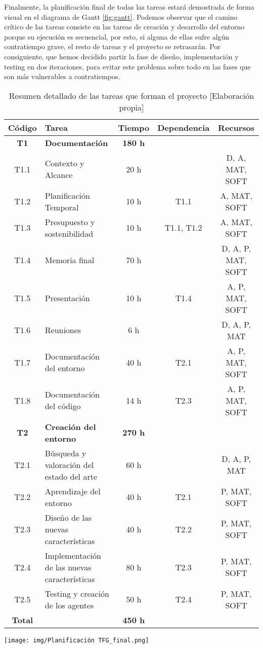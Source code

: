 Finalmente, la planificación final de todas las tareas estará demostrada de forma visual en el diagrama de Gantt \ref{fig:gantt}. Podemos observar que el camino crítico de las tareas consiste en las tareas de creación y desarrollo del entorno porque su ejecución es secuencial, por esto, si alguna de ellas sufre algún contratiempo grave, el resto de tareas y el proyecto se retrasarán. Por consiguiente, que hemos decidido partir la fase de diseño, implementación y testing en dos iteraciones, para evitar este problema sobre todo en las fases que son más vulnerables a contratiempos.

\begin{table}[t]
    \begin{center}
        \begin{tabular}{| c | l | c | c | c |}
        \hline
        \textbf{Código} & \textbf{Tarea} & \textbf{Tiempo} & \textbf{Dependencia} & \textbf{Recursos} \\ \hline
        \textbf{T1} & \textbf{Documentación} & \textbf{180 h} & & \\ \hline
        T1.1 & Contexto y Alcance & 20 h & & D, A, MAT, SOFT \\
        T1.2 & Planificación Temporal & 10 h & T1.1 & A, MAT, SOFT \\
        T1.3 & Presupuesto y sostenibilidad & 10 h & T1.1, T1.2 & A, MAT, SOFT \\
        T1.4 & Memoria final & 70 h &  & D, A, P, MAT, SOFT \\
        T1.5 & Presentación & 10 h & T1.4 & A, P, MAT, SOFT \\
        T1.6 & Reuniones & 6 h & & D, A, P, MAT \\ 
        T1.7 & Documentación del entorno & 40 h & T2.1 & A, P, MAT, SOFT \\ 
        T1.8 & Documentación del código & 14 h & T2.3 & A, P, MAT, SOFT \\ 
        \hline
        \textbf{T2} & \textbf{Creación del entorno} & \textbf{270 h} & &  \\ \hline
        T2.1 & Búsqueda y valoración del estado del arte & 60 h & & D, A, P, MAT \\
        T2.2 & Aprendizaje del entorno & 40 h & T2.1 & P, MAT, SOFT \\
        T2.3 & Diseño de las nuevas características & 40 h & T2.2 & P, MAT, SOFT \\
        T2.4 & Implementación de las nuevas características & 80 h & T2.3 & P, MAT, SOFT \\
        T2.5 & Testing y creación de los agentes & 50 h & T2.4 & P, MAT, SOFT \\
         \hline
         \textbf{Total} & & \textbf{450 h} & & \\
         \hline
        \end{tabular}
        \caption{Resumen detallado de las tareas que forman el proyecto [Elaboración propia]}
        \label{tab:planificacion-tareas}
    \end{center}
\end{table}

\begin{center}
    \texttt{[image: img/Planificación TFG\_final.png]}
     \label{fig:gantt}
\end{center}

